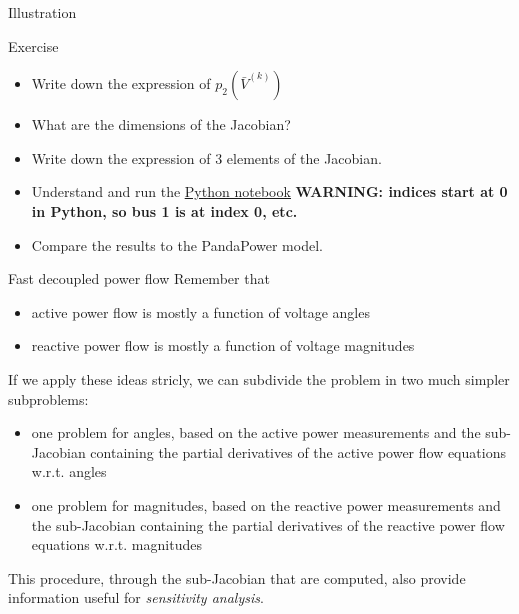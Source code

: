 \begin{frame}[allowframebreaks]{Illustration}
\begin{block}{Exercise}
\begin{itemize}
    \item Write down the expression of $p_{2}\left(\bar{V}^{(k)}\right)$
    \item What are the dimensions of the Jacobian?
    \item Write down the expression of 3 elements of the Jacobian.
    \item Understand and run the \href{https://github.com/bcornelusse/ELEC0447-analysis-power-systems/tree/master/notebooks/power_flow_3-bus_Newton_Raphson.ipynb}{\underline{Python notebook}} 
    \textbf{WARNING: indices start at 0 in Python, so bus 1 is at index 0, etc.}
    \item Compare the results to the PandaPower model.
\end{itemize}

\end{block}


\end{frame}

\begin{frame}[allowframebreaks]{Fast decoupled power flow}
    Remember that
    \begin{itemize}
        \item active power flow is mostly a function of voltage angles
        \item reactive power flow is mostly a function of voltage magnitudes
    \end{itemize}
    
    If we apply these ideas stricly, we can subdivide the problem in two much simpler subproblems:
    \begin{itemize}
        \item one problem for angles, based on the active power measurements and the sub-Jacobian containing the partial derivatives of the active power flow equations w.r.t. angles
        \item one problem for magnitudes, based on the reactive power measurements and the sub-Jacobian containing the partial derivatives of the reactive power flow equations w.r.t. magnitudes
    \end{itemize}
    
    This procedure, through the sub-Jacobian that are computed, also provide information useful for \textit{sensitivity analysis}.
\end{frame}

